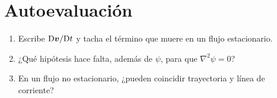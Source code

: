 \section{Autoevaluación}
\begin{enumerate}[leftmargin=1.4em]
\item Escribe \(\mathrm{D}\boldsymbol{v}/\mathrm{D}t\) y tacha el término que muere en un flujo estacionario.
\item ¿Qué hipótesis hace falta, además de \(\psi\), para que \(\nabla^2\psi=0\)?
\item En un flujo no estacionario, ¿pueden coincidir trayectoria y línea de corriente?
\end{enumerate}
